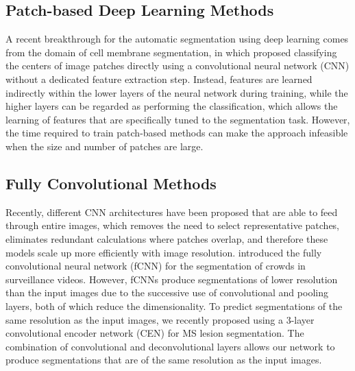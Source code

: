 \subsection[Patch-based deep learning methods]{Patch-based Deep Learning
Methods}

A recent breakthrough for the automatic segmentation using deep learning comes
from the domain of cell membrane segmentation, in which \citet{ciresan2012}
proposed classifying the centers of image patches directly using a convolutional
neural network (CNN) \citep{lecun1998} without a dedicated feature extraction
step. Instead, features are learned indirectly within the lower layers of the
neural network during training, while the higher layers can be regarded as
performing the classification, which allows the learning of features that are
specifically tuned to the segmentation task. However, the time required to train
patch-based methods can make the approach infeasible when the size and number of
patches are large.

\subsection[Fully convolutional methods]{Fully Convolutional Methods}

Recently, different CNN architectures
\citep{long2015,ronneberger2015,brosch2015,kang2014fully} have been proposed
that are able to feed through entire images, which removes the need to select
representative patches, eliminates redundant calculations where patches overlap,
and therefore these models scale up more efficiently with image resolution.
\citet{kang2014fully} introduced the fully convolutional neural network (fCNN)
for the segmentation of crowds in surveillance videos. However, fCNNs produce
segmentations of lower resolution than the input images due to the successive
use of convolutional and pooling layers, both of which reduce the
dimensionality. To predict segmentations of the same resolution as the input
images, we recently proposed using a 3-layer convolutional encoder network (CEN)
\citep{brosch2015} for MS lesion segmentation. The combination of convolutional
\citep{lecun1998} and deconvolutional \citep{zeiler2011} layers allows our
network to produce segmentations that are of the same resolution as the input
images.

